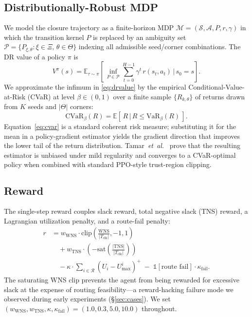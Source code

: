\documentclass[journal,onecolumn=false]{IEEEtran}
\begin{document}
\subsection{Distributionally-Robust MDP}
We model the closure trajectory as a finite-horizon MDP $\mathcal{M} = (\mathcal{S}, \mathcal{A}, P, r, \gamma)$ in which the transition kernel $P$ is replaced by an ambiguity set $\mathcal{P} = \{P_{\xi,\theta} : \xi \in \Xi,\, \theta \in \Theta\}$ indexing all admissible seed/corner combinations. The DR value of a policy $\pi$ is
\begin{equation}
V^{\pi}(s) = \mathbb{E}_{\tau \sim \pi}\!\left[\, \inf_{P \in \mathcal{P}} \sum_{t=0}^{H-1} \gamma^{t}\, r(s_t, a_t)\, \Big|\, s_0 = s \right].
\label{eq:drvalue}
\end{equation}
We approximate the infimum in \eqref{eq:drvalue} by the empirical Conditional-Value-at-Risk (CVaR) at level $\beta \in (0,1)$ over a finite sample $\{R_{k,\theta}\}$ of returns drawn from $K$ seeds and $|\Theta|$ corners:
\begin{equation}
\mathrm{CVaR}_{\beta}(R) = \mathbb{E}\!\left[\, R \,\big|\, R \leq \mathrm{VaR}_{\beta}(R)\, \right].
\label{eq:cvar}
\end{equation}
Equation~\eqref{eq:cvar} is a standard coherent risk measure; substituting it for the mean in a policy-gradient estimator yields the gradient direction that improves the lower tail of the return distribution. Tamar~\emph{et~al.}\ \cite{tamar2015cvar} prove that the resulting estimator is unbiased under mild regularity and converges to a CVaR-optimal policy when combined with standard PPO-style trust-region clipping.

\subsection{Reward}
The single-step reward couples slack reward, total negative slack (TNS) reward, a Lagrangian utilization penalty, and a route-fail penalty:
\begin{align}
r &= w_{\text{WNS}} \cdot \mathrm{clip}\!\left(\frac{\mathrm{WNS}}{|T_{\text{clk}}|}, -1, 1\right) \nonumber \\
  &\quad + w_{\text{TNS}} \cdot \left( -\mathrm{sat}\!\left(\frac{|\mathrm{TNS}|}{|T_{\text{clk}}|}\right)\right) \nonumber \\
  &\quad - \kappa \cdot \sum_{i \in \mathcal{R}} (U_i - U_{\max}^{i})^{+} \;-\; \mathbb{1}[\text{route fail}] \cdot \kappa_{\text{fail}}.
\label{eq:reward}
\end{align}
The saturating WNS clip prevents the agent from being rewarded for excessive slack at the expense of routing feasibility---a reward-hacking failure mode we observed during early experiments (\S\ref{sec:cases}). We set $(w_{\text{WNS}}, w_{\text{TNS}}, \kappa, \kappa_{\text{fail}}) = (1.0, 0.3, 5.0, 10.0)$ throughout.
\end{document}
